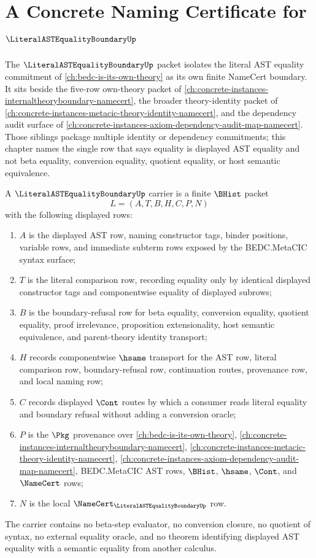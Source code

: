 \chapter{A Concrete Naming Certificate for $\LiteralASTEqualityBoundaryUp$}
\label{ch:concrete-instances-literal-ast-equality-boundary-namecert}

The $\LiteralASTEqualityBoundaryUp$ packet isolates the literal AST equality commitment of \autoref{ch:bedc-is-its-own-theory} as its own finite NameCert boundary. It sits beside the five-row own-theory packet of \autoref{ch:concrete-instances-internaltheoryboundary-namecert}, the broader theory-identity packet of \autoref{ch:concrete-instances-metacic-theory-identity-namecert}, and the dependency audit surface of \autoref{ch:concrete-instances-axiom-dependency-audit-map-namecert}. Those siblings package multiple identity or dependency commitments; this chapter names the single row that says equality is displayed AST equality and not beta equality, conversion equality, quotient equality, or host semantic equivalence.

\begin{definition}
\label{def:literal-ast-equality-boundary-carrier}
A $\LiteralASTEqualityBoundaryUp$ carrier is a finite $\BHist$ packet
$$
L=(A,T,B,H,C,P,N)
$$
with the following displayed rows:
\begin{enumerate}
\item $A$ is the displayed AST row, naming constructor tags, binder positions, variable rows, and immediate subterm rows exposed by the BEDC.MetaCIC syntax surface;
\item $T$ is the literal comparison row, recording equality only by identical displayed constructor tags and componentwise equality of displayed subrows;
\item $B$ is the boundary-refusal row for beta equality, conversion equality, quotient equality, proof irrelevance, proposition extensionality, host semantic equivalence, and parent-theory identity transport;
\item $H$ records componentwise $\hsame$ transport for the AST row, literal comparison row, boundary-refusal row, continuation routes, provenance row, and local naming row;
\item $C$ records displayed $\Cont$ routes by which a consumer reads literal equality and boundary refusal without adding a conversion oracle;
\item $P$ is the $\Pkg$ provenance over \autoref{ch:bedc-is-its-own-theory}, \autoref{ch:concrete-instances-internaltheoryboundary-namecert}, \autoref{ch:concrete-instances-metacic-theory-identity-namecert}, \autoref{ch:concrete-instances-axiom-dependency-audit-map-namecert}, BEDC.MetaCIC AST rows, $\BHist$, $\hsame$, $\Cont$, and $\NameCert$ rows;
\item $N$ is the local $\NameCert_{\LiteralASTEqualityBoundaryUp}$ row.
\end{enumerate}
The carrier contains no beta-step evaluator, no conversion closure, no quotient of syntax, no external equality oracle, and no theorem identifying displayed AST equality with a semantic equality from another calculus.
\end{definition}

